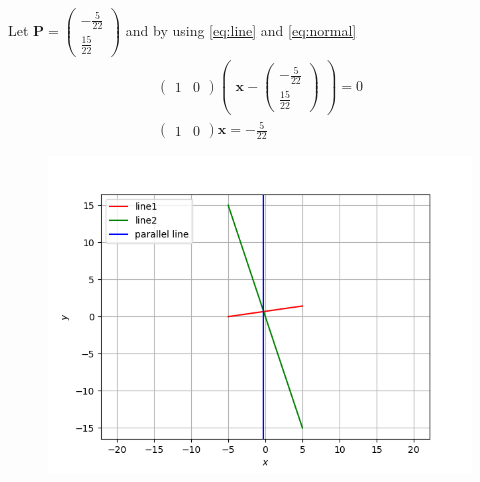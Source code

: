 \documentclass[12pt]{article}
\newcommand{\myvec}[1]{\ensuremath{\begin{pmatrix}#1\end{pmatrix}}}
\let\vec\mathbf
\begin{document}
Let $\vec{P}=\myvec{-\frac{5}{22}\\[1pt] \frac{15}{22}}$ and by using \eqref{eq:line} and \eqref{eq:normal}
\begin{align}
    \myvec{1&0}\myvec{\vec{x}-\myvec{-\frac{5}{22}\\[1pt] \frac{15}{22}}}=0\\
    \myvec{1&0}\vec{x}=-\frac{5}{22}
\end{align}
\begin{figure}[H]
	\begin{center} 
	    \includegraphics[width=\columnwidth]{figs/line.png}
	\end{center}
\caption{}
\label{fig:Fig3}
\end{figure}
\end{document}
